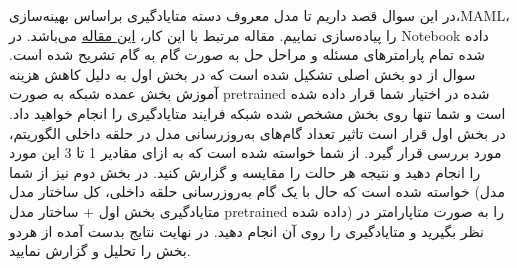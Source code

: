 \documentclass{article}
\begin{document}
در این سوال قصد داریم تا مدل معروف دسته متایادگیری براساس بهینه‌سازی،‌MAML،‌ را پیاده‌سازی نماییم. مقاله مرتبط با این کار،
\href{https://arxiv.org/pdf/1703.03400}{این مقاله}
می‌باشد. در Notebook داده شده تمام پارامترهای مسئله و مراحل حل به صورت گام به گام تشریح شده است.
سوال از دو بخش اصلی تشکیل شده است که در بخش اول به دلیل کاهش هزینه آموزش بخش عمده شبکه به صورت pretrained شده در اختیار شما قرار داده شده است و شما تنها روی بخش مشخص شده شبکه فرایند متایادگیری را انجام خواهید داد. در بخش اول قرار است تاثیر تعداد گام‌های به‌روزرسانی مدل در حلقه داخلی الگوریتم، مورد بررسی قرار گیرد. از شما خواسته شده است که به ازای مقادیر 1 تا 3 این مورد را انجام دهید و نتیجه هر حالت را مقایسه و گزارش کنید. در بخش دوم نیز از شما خواسته شده است که حال با یک گام به‌روزرسانی حلقه داخلی‌، کل ساختار مدل (مدل متایادگیری بخش اول + ساختار مدل pretrained داده شده) را به صورت متاپارامتر در نظر بگیرید و متایادگیری را روی آن انجام دهید. در نهایت نتایج بدست آمده از هردو بخش را تحلیل و گزارش نمایید.
\end{document}
